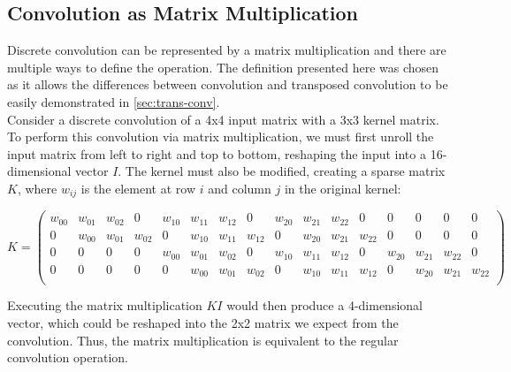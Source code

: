 \subsection{Convolution as Matrix Multiplication} \label{sec:conv-matrix}
 
Discrete convolution can be represented by a matrix multiplication and there are multiple ways to define the operation. The definition presented here was chosen as it allows the differences between convolution and transposed convolution to be easily demonstrated in \autoref{sec:trans-conv}. \\

\noindent Consider a discrete convolution of a 4x4 input matrix with a 3x3 kernel matrix. To perform this convolution via matrix multiplication, we must first unroll the input matrix from left to right and top to bottom, reshaping the input into a 16-dimensional vector $I$. The kernel must also be modified, creating a sparse matrix $K$, where $w_{ij}$ is the element at row $i$ and column $j$ in the original kernel:

\begin{equation}
    K = 
    \left(
    \begin{smallmatrix}
    \textit{$w_{00}$} & \textit{$w_{01}$} & \textit{$w_{02}$} & 0 & \textit{$w_{10}$} & \textit{$w_{11}$} & \textit{$w_{12}$} & 0 & \textit{$w_{20}$} & \textit{$w_{21}$} & \textit{$w_{22}$} & 0 & 0 & 0 & 0 & 0 \\
    0 & \textit{$w_{00}$} & \textit{$w_{01}$} & \textit{$w_{02}$} & 0 & \textit{$w_{10}$} & \textit{$w_{11}$} & \textit{$w_{12}$} & 0 & \textit{$w_{20}$} & \textit{$w_{21}$} & \textit{$w_{22}$} & 0 & 0 & 0 & 0 \\
    0 & 0 & 0 & 0 & \textit{$w_{00}$} & \textit{$w_{01}$} & \textit{$w_{02}$} & 0 & \textit{$w_{10}$} & \textit{$w_{11}$} & \textit{$w_{12}$} & 0 & \textit{$w_{20}$} & \textit{$w_{21}$} & \textit{$w_{22}$} & 0 \\
    0 & 0 & 0 & 0 & 0 & \textit{$w_{00}$} & \textit{$w_{01}$} & \textit{$w_{02}$} & 0 & \textit{$w_{10}$} & \textit{$w_{11}$} & \textit{$w_{12}$} & 0 & \textit{$w_{20}$} & \textit{$w_{21}$} & \textit{$w_{22}$} \\
    \end{smallmatrix}
    \right)
\end{equation} \label{eq:kernel-matrix}

\noindent Executing the matrix multiplication $KI$ would then produce a 4-dimensional vector, which could be reshaped into the 2x2 matrix we expect from the convolution. Thus, the matrix multiplication is equivalent to the regular convolution operation.

